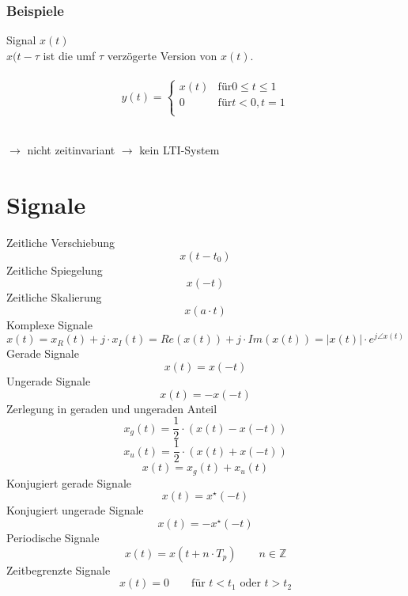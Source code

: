 \documentclass[a4paper, 10pt, fleqn]{article}
\begin{document}
\subsubsection{Beispiele}
Signal $x(t)$ \\
$x(t - \tau$ ist die umf $\tau$ verzögerte Version von $x(t)$. \\\\
\[
    y(t) = \left\{
    \begin{array}{lll}
        x(t) & \text{für} 0 \leq t \leq 1 \\
        0    & \text{für} t < 0, t = 1 \\
    \end{array}
    \right.
\]
\\
$\to$ nicht zeitinvariant $\to$ kein LTI-System

\section{Signale}
Zeitliche Verschiebung
\[ x(t - t_0) \]
Zeitliche Spiegelung
\[ x(-t) \]
Zeitliche Skalierung
\[ x(a \cdot t) \]
Komplexe Signale
\[ x(t) = x_R(t) + j \cdot x_I(t) = Re(x(t)) + j \cdot Im(x(t)) = |x(t)| \cdot e^{j \angle x(t)} \]
Gerade Signale
\[ x(t) = x(-t) \]
Ungerade Signale
\[ x(t) = -x(-t) \]
Zerlegung in geraden und ungeraden Anteil
\[ x_g(t) = \frac{1}{2} \cdot \left(x(t) - x(-t)\right) \]
\[ x_u(t) = \frac{1}{2} \cdot \left(x(t) + x(-t)\right) \]
\[ x(t) = x_g(t) + x_u(t) \]
Konjugiert gerade Signale
\[ x(t) = x^{\star}(-t) \]
Konjugiert ungerade Signale
\[ x(t) = -x^{\star}(-t) \]
Periodische Signale
\[ x(t) = x(t + n \cdot T_p) \qquad n \in \mathbb{Z} \]
Zeitbegrenzte Signale
\[ x(t) = 0 \qquad \text{für $t < t_1$ oder $t > t_2$} \]
\end{document}
